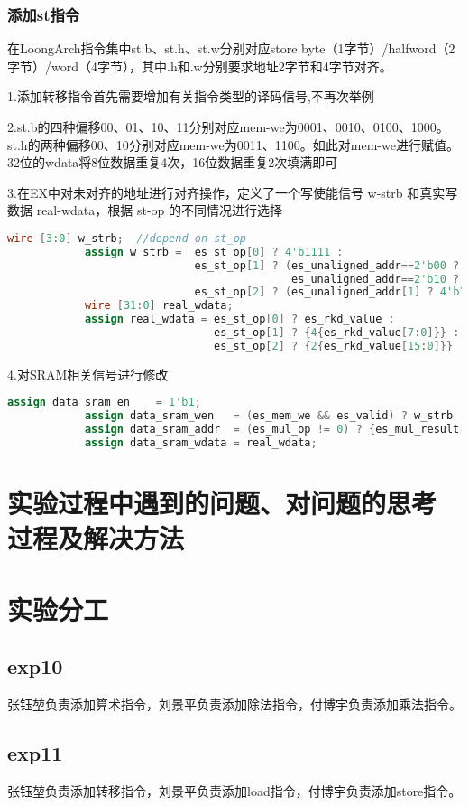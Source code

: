 \documentclass[12pt,a4paper]{article}
\newcommand*{\song}{\CJKfamily{zhsong}}
\newcommand{\sectionfont}{\song\textbf}
\begin{document}
        \subsubsection{添加st指令}
        在LoongArch指令集中st.b、st.h、st.w分别对应store byte（1字节）/halfword（2字节）/word（4字节），其中.h和.w分别要求地址2字节和4字节对齐。
        \par
        1.添加转移指令首先需要增加有关指令类型的译码信号,不再次举例
        \par
        2.st.b的四种偏移00、01、10、11分别对应mem-we为0001、0010、0100、1000。st.h的两种偏移00、10分别对应mem-we为0011、1100。如此对mem-we进行赋值。32位的wdata将8位数据重复4次，16位数据重复2次填满即可
        \par
        3.在EX中对未对齐的地址进行对齐操作，定义了一个写使能信号 w-strb 和真实写数据 real-wdata，根据 st-op 的不同情况进行选择
        \begin{lstlisting}[language=Verilog]
            wire [3:0] w_strb;  //depend on st_op
            assign w_strb =  es_st_op[0] ? 4'b1111 :
                             es_st_op[1] ? (es_unaligned_addr==2'b00 ? 4'b0001 : es_unaligned_addr==2'b01 ? 4'b0010 : 
                                            es_unaligned_addr==2'b10 ? 4'b0100 : 4'b1000) : 
                             es_st_op[2] ? (es_unaligned_addr[1] ? 4'b1100 : 4'b0011) : 4'b0000;
            wire [31:0] real_wdata;
            assign real_wdata = es_st_op[0] ? es_rkd_value :
                                es_st_op[1] ? {4{es_rkd_value[7:0]}} :
                                es_st_op[2] ? {2{es_rkd_value[15:0]}} : 32'b0;
        \end{lstlisting}\par
        4.对SRAM相关信号进行修改
        \begin{lstlisting}[language=Verilog]
            assign data_sram_en    = 1'b1;   
            assign data_sram_wen   = (es_mem_we && es_valid) ? w_strb : 4'b0000;
            assign data_sram_addr  = (es_mul_op != 0) ? {es_mul_result[31:2],2'b00} : {es_alu_result[31:2],2'b00};
            assign data_sram_wdata = real_wdata;   
        \end{lstlisting}



\section{\sectionfont 实验过程中遇到的问题、对问题的思考过程及解决方法}

\section{\sectionfont 实验分工}
    \subsection{exp10}
        张钰堃负责添加算术指令，刘景平负责添加除法指令，付博宇负责添加乘法指令。
    \subsection{exp11}
        张钰堃负责添加转移指令，刘景平负责添加load指令，付博宇负责添加store指令。
\end{document}
